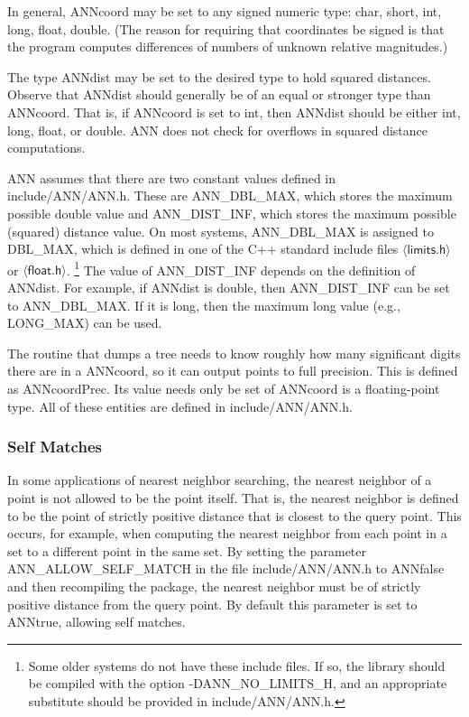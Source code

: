 \documentclass[11pt]{article}		%
\newcommand\ang[1]{\langle #1\rangle}
\newcommand{\ANN}[0]{\textsf{ANN}}
\begin{document}
In general, \textsf{ANNcoord} may be set to any signed numeric type:
\textsf{char}, \textsf{short}, \textsf{int}, \textsf{long},
\textsf{float}, \textsf{double}.  (The reason for requiring that
coordinates be signed is that the program computes differences of
numbers of unknown relative magnitudes.)

The type \textsf{ANNdist} may be set to the desired type to hold squared
distances.  Observe that \textsf{ANNdist} should generally be of an
equal or stronger type than \textsf{ANNcoord}.  That is, if
\textsf{ANNcoord} is set to \textsf{int}, then \textsf{ANNdist} should
be either \textsf{int}, \textsf{long}, \textsf{float}, or
\textsf{double}.  {\ANN} does not check for overflows in squared
distance computations.

{\ANN} assumes that there are two constant values defined in
\textsf{include/ANN/ANN.h}.  These are \textsf{ANN\_DBL\_MAX}, which
stores the maximum possible double value and \textsf{ANN\_DIST\_INF},
which stores the maximum possible (squared) distance value.  On most
systems, \textsf{ANN\_DBL\_MAX} is assigned to \textsf{DBL\_MAX}, which
is defined in one of the C++ standard include files
$\ang{\textsf{limits.h}}$ or $\ang{\textsf{float.h}}$.%
%
\footnote{Some older systems do not have these include files.  If so,
the library should be compiled with the option
\textsf{-DANN\_NO\_LIMITS\_H}, and an appropriate substitute should be
provided in \textsf{include/ANN/ANN.h}.}
%
The value
of \textsf{ANN\_DIST\_INF} depends on the definition of
\textsf{ANNdist}.  For example, if \textsf{ANNdist} is \textsf{double},
then \textsf{ANN\_DIST\_INF} can be set to \textsf{ANN\_DBL\_MAX}.  If
it is \textsf{long}, then the maximum long value (e.g.,
\textsf{LONG\_MAX}) can be used.

The routine that dumps a tree needs to know roughly how many significant
digits there are in a \textsf{ANNcoord}, so it can output points to full
precision.  This is defined as \textsf{ANNcoordPrec}.  Its value needs
only be set of \textsf{ANNcoord} is a floating-point type.  All of these
entities are defined in \textsf{include/ANN/ANN.h}.

\subsubsection{Self Matches}

In some applications of nearest neighbor searching, the nearest neighbor
of a point is not allowed to be the point itself.  That is, the nearest
neighbor is defined to be the point of strictly positive distance that
is closest to the query point.  This occurs, for example, when computing
the nearest neighbor from each point in a set to a different point in
the same set.  By setting the parameter \textsf{ANN\_ALLOW\_SELF\_MATCH}
in the file \textsf{include/ANN/ANN.h} to \textsf{ANNfalse} and then
recompiling the package, the nearest neighbor must be of strictly
positive distance from the query point.  By default this parameter is
set to \textsf{ANNtrue}, allowing self matches.
\end{document}
